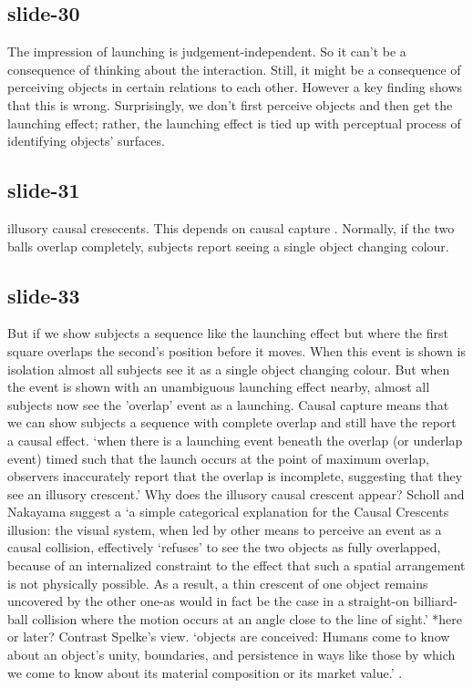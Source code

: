 \documentclass[12pt,\papersize]{extarticle}
\begin{document}
 
\subsection{slide-30}
The impression of launching is judgement-independent. So it can't be a consequence of thinking about the interaction. Still, it might be a consequence of perceiving objects in certain relations to each other. However a key finding shows that this is wrong. Surprisingly, we don't first perceive objects and then get the launching effect; rather, the launching effect is tied up with perceptual process of identifying objects' surfaces.
 
 
\subsection{slide-31}
illusory causal cresecents.
This depends on causal capture \citep{Scholl:2002eb}.
Normally, if the two balls overlap completely, subjects report seeing a single object changing colour.
 
 
\subsection{slide-33}
But if we show subjects a sequence like the launching effect but where the first square overlaps the second's position before it moves. When this event is shown is isolation almost all subjects see it as a single object changing colour. But when the event is shown with an unambiguous launching effect nearby, almost all subjects now see the 'overlap' event as a launching.
Causal capture means that we can show subjects a sequence with complete overlap and still have the report a causal effect.
‘when there is a launching event beneath the overlap (or underlap event) timed such that the launch occurs at the point of maximum overlap, observers inaccurately report that the overlap is incomplete, suggesting that they see an illusory crescent.’
\citep[p.\ 461]{Scholl:2004dx}
Why does the illusory causal crescent appear? Scholl and Nakayama suggest a
‘a simple categorical explanation for the Causal Crescents illusion: the visual system, when led by other means to perceive an event as a causal collision, effectively ‘refuses’ to see the two objects as fully overlapped, because of an internalized constraint to the effect that such a spatial arrangement is not physically possible. As a result, a thin crescent of one object remains uncovered by the other one-as would in fact be the case in a straight-on billiard-ball collision where the motion occurs at an angle close to the line of sight.’
\citep[p.\ 466]{Scholl:2004dx}
*here or later?
Contrast Spelke’s view.
‘objects are conceived: Humans come to know about an object’s unity, boundaries, and persistence in ways like those by which we come to know about its material composition or its market value.’
\citep[p.\ 198]{Spelke:1988xc}.
 
\end{document}

